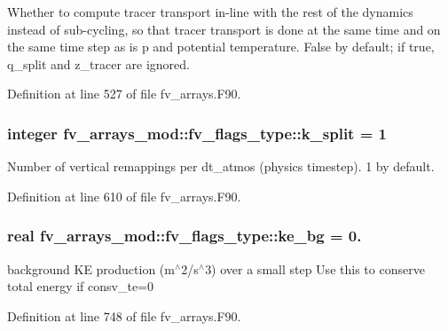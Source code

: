 Whether to compute tracer transport in-\/line with the rest of the dynamics instead of sub-\/cycling, so that tracer transport is done at the same time and on the same time step as is p and potential temperature. False by default; if true, q\-\_\-split and z\-\_\-tracer are ignored. 



Definition at line 527 of file fv\-\_\-arrays.\-F90.

\subsubsection[{k\-\_\-split}]{\setlength{\rightskip}{0pt plus 5cm}integer fv\-\_\-arrays\-\_\-mod\-::fv\-\_\-flags\-\_\-type\-::k\-\_\-split = 1}\label{structfv__arrays__mod_1_1fv__flags__type_aad360e02d5ab08a1d399be638923e040}


Number of vertical remappings per dt\-\_\-atmos (physics timestep). 1 by default. 



Definition at line 610 of file fv\-\_\-arrays.\-F90.

\subsubsection[{ke\-\_\-bg}]{\setlength{\rightskip}{0pt plus 5cm}real fv\-\_\-arrays\-\_\-mod\-::fv\-\_\-flags\-\_\-type\-::ke\-\_\-bg = 0.}\label{structfv__arrays__mod_1_1fv__flags__type_a166399db4aa8c0330f95f0f7df26cc13}


background K\-E production (m$^\wedge$2/s$^\wedge$3) over a small step Use this to conserve total energy if consv\-\_\-te=0 



Definition at line 748 of file fv\-\_\-arrays.\-F90.

